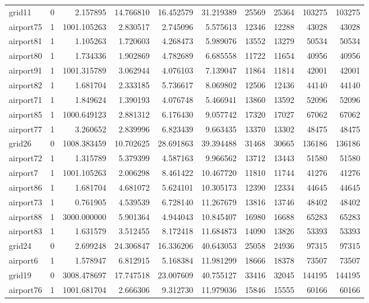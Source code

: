 \begin{longtable}{|l|r|r|r|r|r|r|r|r|r|}
grid11 & 0 & 2.157895 & 14.766810 & 16.452579 & 31.219389 & 25569 & 25364 & 103275 & 103275 \\
airport75 & 1 & 1001.105263 & 2.830517 & 2.745096 & 5.575613 & 12346 & 12288 & 43028 & 43028 \\
airport81 & 1 & 1.105263 & 1.720603 & 4.268473 & 5.989076 & 13552 & 13279 & 50534 & 50534 \\
airport80 & 1 & 1.734336 & 1.902869 & 4.782689 & 6.685558 & 11722 & 11654 & 40956 & 40956 \\
airport91 & 1 & 1001.315789 & 3.062944 & 4.076103 & 7.139047 & 11864 & 11814 & 42001 & 42001 \\
airport82 & 1 & 1.681704 & 2.333185 & 5.736617 & 8.069802 & 12506 & 12436 & 44140 & 44140 \\
airport71 & 1 & 1.849624 & 1.390193 & 4.076748 & 5.466941 & 13860 & 13592 & 52096 & 52096 \\
airport85 & 1 & 1000.649123 & 2.881312 & 6.176430 & 9.057742 & 17320 & 17027 & 67062 & 67062 \\
airport77 & 1 & 3.260652 & 2.839996 & 6.823439 & 9.663435 & 13370 & 13302 & 48475 & 48475 \\
grid26 & 0 & 1008.383459 & 10.702625 & 28.691863 & 39.394488 & 31468 & 30665 & 136186 & 136186 \\
airport72 & 1 & 1.315789 & 5.379399 & 4.587163 & 9.966562 & 13712 & 13443 & 51580 & 51580 \\
airport7 & 1 & 1001.105263 & 2.006298 & 8.461422 & 10.467720 & 11810 & 11744 & 41276 & 41276 \\
airport86 & 1 & 1.681704 & 4.681072 & 5.624101 & 10.305173 & 12390 & 12334 & 44645 & 44645 \\
airport73 & 1 & 0.761905 & 4.539539 & 6.728140 & 11.267679 & 13816 & 13746 & 48402 & 48402 \\
airport88 & 1 & 3000.000000 & 5.901364 & 4.944043 & 10.845407 & 16980 & 16688 & 65283 & 65283 \\
airport83 & 1 & 1.631579 & 3.512455 & 8.172418 & 11.684873 & 14090 & 13826 & 53393 & 53393 \\
grid24 & 0 & 2.699248 & 24.306847 & 16.336206 & 40.643053 & 25058 & 24936 & 97315 & 97315 \\
airport6 & 1 & 1.578947 & 6.812915 & 5.168384 & 11.981299 & 18666 & 18378 & 73507 & 73507 \\
grid19 & 0 & 3008.478697 & 17.747518 & 23.007609 & 40.755127 & 33416 & 32045 & 144195 & 144195 \\
airport76 & 1 & 1001.681704 & 2.666306 & 9.312730 & 11.979036 & 15846 & 15555 & 60166 & 60166 \\

\end{longtable}

